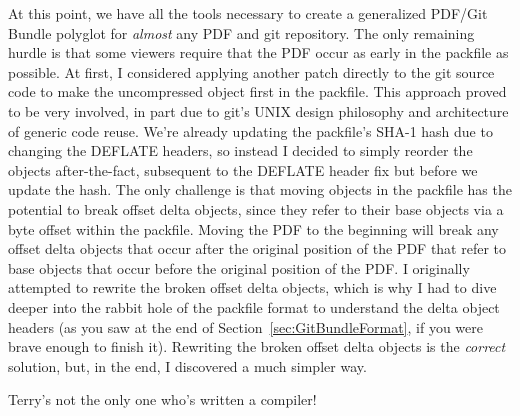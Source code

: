 \documentclass{article}
\begin{document}
At this point, we have all the tools necessary to create a generalized
PDF/Git Bundle polyglot for \emph{almost} any PDF and git
repository. The only remaining hurdle is that some viewers require
that the PDF occur as early in the packfile as possible. At first, I
considered applying another patch directly to the git source code to
make the uncompressed object first in the packfile. This approach
proved to be very involved, in part due to git's UNIX design
philosophy and architecture of generic code reuse. We're already
updating the packfile's SHA-1 hash due to changing the DEFLATE
headers, so instead I decided to simply reorder the objects
after-the-fact, subsequent to the DEFLATE header fix but before we
update the hash. The only challenge is that moving objects in the
packfile has the potential to break offset delta objects, since they
refer to their base objects via a byte offset within the packfile.
Moving the PDF to the beginning will break any offset delta objects
that occur after the original position of the PDF that refer to base
objects that occur before the original position of the PDF. I
originally attempted to rewrite the broken offset delta objects, which
is why I had to dive deeper into the rabbit hole of the packfile
format to understand the delta object headers (as you saw at the end
of Section~\ref{sec:GitBundleFormat}, if you were brave enough to
finish it). Rewriting the broken offset delta objects is
the \emph{correct} solution, but, in the end, I discovered a much
simpler way.

\begin{center}
\end{center}

Terry's not the only one who's written a compiler!
\end{document}
